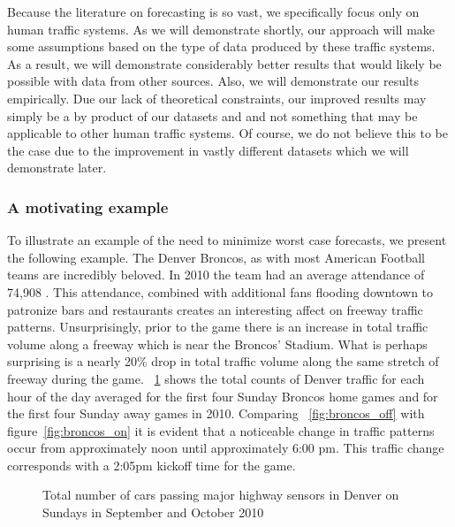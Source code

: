 Because the literature on forecasting is so vast, we specifically focus only on human traffic systems.  As we will demonstrate shortly, our approach will make some assumptions based on the type of data produced by these traffic systems.  As a result, we will demonstrate considerably better results that would likely be possible with data from other sources.  Also, we will demonstrate our results empirically.  Due our lack of theoretical constraints, our improved results may simply be a by product of our datasets and and not something that may be applicable to other human traffic systems.  Of course, we do not believe this to be the case due to the improvement in vastly different datasets which we will demonstrate later.


\subsubsection{A motivating example}

To illustrate an example of the need to minimize worst case forecasts, we present the following example.  The Denver Broncos, as with most American Football teams are incredibly beloved.  In 2010 the team had an average attendance of 74,908 \cite{ESPN2013}.  This attendance, combined with additional fans flooding downtown to patronize bars and restaurants creates an interesting affect on freeway traffic patterns.  Unsurprisingly, prior to the game there is an increase in total traffic volume along a freeway which is near the Broncos' Stadium.  What is perhaps surprising is a nearly 20\% drop in total traffic volume along the same stretch of freeway during the game.  ~\ref{fig:broncos} shows the total counts of Denver traffic for each hour of the day averaged for the first four Sunday Broncos home games and for the first four Sunday away games in 2010.  Comparing ~\ref{fig:broncos_off} with figure~\ref{fig:broncos_on} it is evident that a noticeable change in traffic patterns occur from approximately noon until approximately 6:00 pm.  This traffic change corresponds with a 2:05pm kickoff time for the game.

\begin{figure}[!ht]
	\begin{center}
	\end{center}
	\caption{Total number of cars passing major highway sensors in Denver on Sundays in September and October 2010}
	\label{fig:broncos}
\end{figure}

